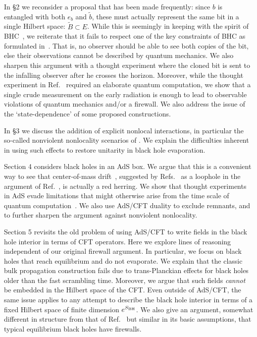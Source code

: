 \documentclass[12pt]{article}
\begin{document}
In \S2 we reconsider a proposal that has been made frequently: since $b$ is entangled with both $e_b$ and $\tilde b$, these must actually represent the same bit in a single Hilbert space: $\tilde B \subset E$.  While this is seemingly in keeping with the spirit of BHC~\cite{Susskind:1993if,Stephens:1993an}, we reiterate that it fails to respect one of the key constraints of BHC as formulated in~\cite{Preskill,Susskind:1993mu}.  That is, no observer should be able to see both copies of the bit, else their observations cannot be described by quantum mechanics.  We also sharpen this argument with a thought experiment where the cloned bit is sent to the infalling observer after he crosses the horizon.  Moreover, while the thought experiment in Ref.~\cite{Almheiri:2012rt} required an elaborate quantum computation, we show that a single crude measurement on the early radiation is enough to lead to observable violations of quantum mechanics and/or a firewall.  We also address the issue of the `state-dependence' of some proposed constructions.

In \S3 we discuss {the addition of
explicit nonlocal interactions, in particular the so-called nonviolent nonlocality scenarios of \cite{Giddings:2011ks,Giddings:2012gc,Giddings:2013kcj}.  We explain the difficulties inherent in using such effects to restore unitarity in black hole evaporation.}

Section 4 considers black holes in an AdS box.  We argue that this is a convenient way to see that center-of-mass drift~\cite{Page:1979tc}, suggested by Refs.~\cite{SussUn, Nomura2,Hsu} as a loophole in the argument of Ref.~\cite{Almheiri:2012rt}, is actually a red herring.
We  show that thought experiments in AdS evade limitations that might otherwise arise from the time scale of quantum computation~\cite{Harlow:2013tf}.
We also use AdS/CFT duality to exclude remnants, and to further sharpen the argument against nonviolent nonlocality.

Section 5 revisits the old problem of using AdS/CFT to write fields in the black hole interior in terms of CFT operators. Here we explore lines of reasoning independent of our original firewall argument.  In particular, we focus on black holes that reach equilibrium and do not evaporate.  We explain that the classic bulk propagation construction fails due to trans-Planckian effects for black holes older than the fast scrambling time.  Moreover, we argue  that such fields {\it cannot} be embedded in the Hilbert space of the \mbox{CFT}.  {Even outside of AdS/CFT, the same issue applies  to any attempt to describe the black hole interior in terms of a fixed Hilbert space of finite dimension $e^{S_{\rm BH}}$.}  We also give an argument, somewhat different in structure from that of Ref.~\cite{Almheiri:2012rt} but similar in its basic assumptions, that typical equilibrium black holes have firewalls.
\end{document}
